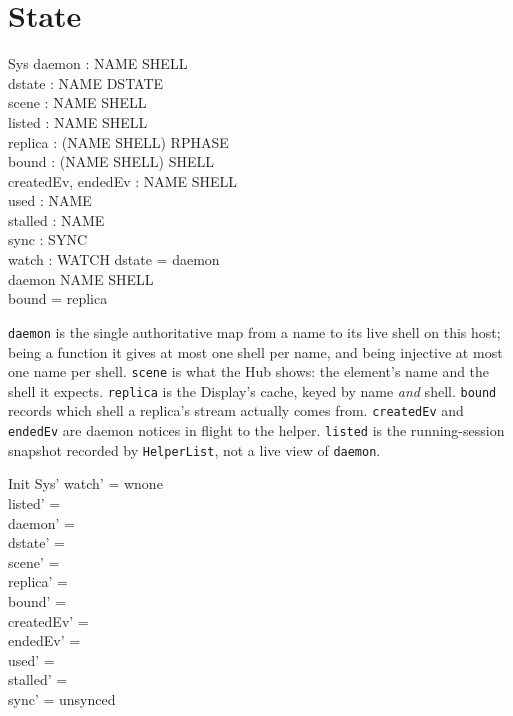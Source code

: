 \documentclass[a4paper,10pt,fleqn]{article}
\begin{document}
\section{State}

\begin{schema}{Sys}
  daemon : NAME \pfun SHELL \\
  dstate : NAME \pfun DSTATE \\
  scene : NAME \pfun SHELL \\
  listed : NAME \pfun SHELL \\
  replica : (NAME \cross SHELL) \pfun RPHASE \\
  bound : (NAME \cross SHELL) \pfun SHELL \\
  createdEv, endedEv : NAME \rel SHELL \\
  used : \power NAME \\
  stalled : \power NAME \\
  sync : SYNC \\
  watch : WATCH
\where
  \dom dstate = \dom daemon \\
  daemon \in NAME \pinj SHELL \\
  \dom bound = \dom replica
\end{schema}

\texttt{daemon} is the single authoritative map from a name to its live
shell on this host; being a function it gives at most one shell per
name, and being injective at most one name per shell.  \texttt{scene}
is what the Hub shows: the element's name and the shell it expects.
\texttt{replica} is the Display's cache, keyed by name \emph{and} shell.
\texttt{bound} records which shell a replica's stream actually comes
from.  \texttt{createdEv} and \texttt{endedEv} are daemon notices in
flight to the helper. \texttt{listed} is the running-session snapshot
recorded by \texttt{HelperList}, not a live view of \texttt{daemon}.

\begin{schema}{Init}
  Sys'
\where
  watch' = wnone \\
  listed' = \emptyset \\
  daemon' = \emptyset \\
  dstate' = \emptyset \\
  scene' = \emptyset \\
  replica' = \emptyset \\
  bound' = \emptyset \\
  createdEv' = \emptyset \\
  endedEv' = \emptyset \\
  used' = \emptyset \\
  stalled' = \emptyset \\
  sync' = unsynced
\end{schema}
\end{document}
